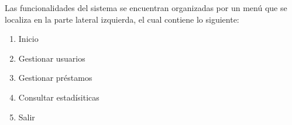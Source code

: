 Las funcionalidades del sistema se encuentran organizadas por
un menú que se localiza en la parte lateral izquierda, el 
cual contiene lo siguiente:

\begin{enumerate}
	\item Inicio
	\item Gestionar usuarios
	\item Gestionar préstamos
	\item Consultar estadísiticas
	\item Salir
\end{enumerate} 
